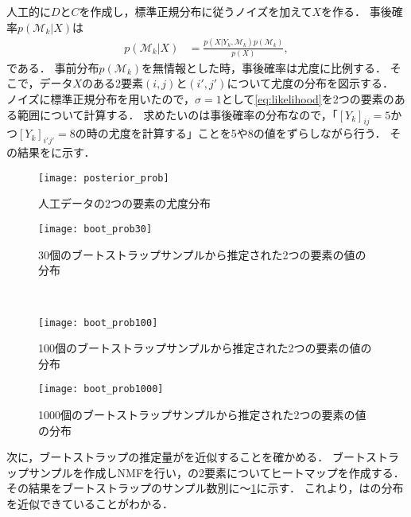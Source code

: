 人工的に$D$と$C$を作成し，標準正規分布に従うノイズを加えて$X$を作る．
事後確率$p(\mathcal{M}_k | X)$は
\begin{align}
	p(\mathcal{M}_k | X) &= \frac{p(X | Y_k, \mathcal{M}_k) p(\mathcal{M}_k)}{p(X)},
\end{align}
である．
事前分布$p(\mathcal{M}_k)$を無情報とした時，事後確率は尤度に比例する．
そこで，データ$X$のある2要素$(i,j)$と$(i',j')$について尤度の分布を図示する．
ノイズに標準正規分布を用いたので，$\sigma = 1$として\eqref{eq:likelihood}を2つの要素のある範囲について計算する．
求めたいのは事後確率の分布なので，「$[Y_k]_{ij}=5$かつ$[Y_k]_{i'j'}=8$の時の尤度を計算する」ことを5や8の値をずらしながら行う．
その結果をに示す．
\begin{figure}[htbp]
    \begin{minipage}{0.5\hsize}
			\begin{center}
					\texttt{[image: posterior\_prob]}
					\caption{人工データの2つの要素の尤度分布}
					\label{fig:posprob}
			\end{center}
		\end{minipage}
    \begin{minipage}{0.5\hsize}
			\begin{center}
					\texttt{[image: boot\_prob30]}
					\caption{30個のブートストラップサンプルから推定された2つの要素の値の分布}
					\label{fig:boot_prob30}
			\end{center}
		\end{minipage}\\
    \begin{minipage}{0.5\hsize}
			\begin{center}
					\texttt{[image: boot\_prob100]}
					\caption{100個のブートストラップサンプルから推定された2つの要素の値の分布}
					\label{fig:boot_prob100}
			\end{center}
		\end{minipage}
    \begin{minipage}{0.5\hsize}
			\begin{center}
					\texttt{[image: boot\_prob1000]}
					\caption{1000個のブートストラップサンプルから推定された2つの要素の値の分布}
					\label{fig:boot_prob1000}
			\end{center}
		\end{minipage}
\end{figure}

次に，ブートストラップの推定量がを近似することを確かめる．
ブートストラップサンプルを作成しNMFを行い，の2要素についてヒートマップを作成する．
その結果をブートストラップのサンプル数別に〜\ref{fig:boot_prob1000}に示す．
これより，はの分布を近似できていることがわかる．


